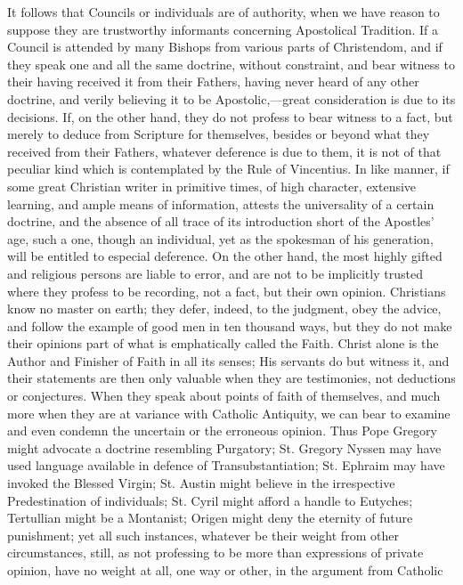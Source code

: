 It follows that Councils or individuals are of authority, when we
have reason to suppose they are trustworthy informants concerning
Apostolical Tradition. If a Council is attended by many Bishops from
various parts of Christendom, and if they speak one and all the same
doctrine, without constraint, and bear witness to their having
received it from their Fathers, having never heard of any other
doctrine, and verily believing it to be Apostolic,—great
consideration is due to its decisions. If, on the other hand, they do
not profess to bear witness to a fact, but merely to deduce from
Scripture for themselves, besides or beyond what they received from
their Fathers, whatever deference is due to them, it is not of that
peculiar kind which is contemplated by the Rule of Vincentius. In like
manner, if some great Christian writer in primitive times, of high
character, extensive learning, and ample means of information, attests
the universality of a certain doctrine, and the absence of all trace
of its introduction short of the Apostles' age, such a one, though an
individual, yet as the spokesman of his generation, will be entitled
to especial deference. On the other hand, the most highly gifted and
religious persons are liable to error, and are not to be implicitly
trusted where they profess to be recording, not a fact, but their own
opinion. Christians know no master on earth; they defer, indeed, to
the judgment, obey the advice, and follow the example of good men in
ten thousand ways, but they do not make their opinions part of what is
emphatically called the Faith. Christ alone is the Author and Finisher
of Faith in all its senses; His servants do but witness it, and their
statements are then only valuable when they are testimonies, not
deductions or conjectures. When they speak about points of faith of
themselves, and much more when they are at variance with Catholic
Antiquity, we can bear to examine and even condemn the uncertain or
the erroneous opinion. Thus Pope Gregory might advocate a doctrine
resembling Purgatory; St. Gregory Nyssen may have used language
available in defence of Transubstantiation; St. Ephraim may have
invoked the Blessed Virgin; St. Austin might believe in the
irrespective Predestination of individuals; St. Cyril might afford a
handle to Eutyches; Tertullian might be a Montanist; Origen might deny
the eternity of future punishment; yet all such instances,
whatever be their weight from other circumstances, still, as not
professing to be more than expressions of private opinion, have no
weight at all, one way or other, in the argument from Catholic
